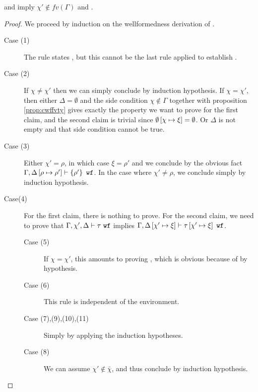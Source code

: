 \documentclass[a4paper]{article}
\begin{document}
\begin{prop}
   and \ctwf{\Gamma}{\xi} imply $\chi'\notin fv(\Gamma)$ and
  .
  \label{prop:cwftysub}
\end{prop}
\begin{proof}
  We proceed by induction on the wellformedness derivation of . 
  \begin{description}

    \item[Case (1)] The rule states \cwf{\emptyset}, but this cannot be the
      last rule applied to establish .

    \item[Case (2)] If $\chi \neq \chi'$ then we can simply conclude by induction
      hypothesis. If $\chi = \chi'$, then either $\Delta=\emptyset$ and the side
      condition $\chi\notin\Gamma$ together with proposition \ref{prop:cwffvty} gives
      exactly the property we want to prove for the first claim, and the
      second claim is trivial since $\emptyset\left[ \chi\mapsto \xi \right] =
      \emptyset$. Or $\Delta$ is not empty and that side condition cannot be true.

    \item[Case (3)] Either $\chi' = \rho$, in which case $\xi = \rho'$ and we conclude by
      the obvious fact ${\normalfont \Gamma,\Delta\left[ \rho\mapsto \rho' \right] \vdash \left\{ \rho' \right\}\ \texttt{wf}}$. In the case
      where $\chi' \neq \rho$, we conclude simply by induction hypothesis.

    \item[Case(4)] For the first claim, there is nothing to prove. For the
      second claim, we need to prove that ${\normalfont \Gamma,\chi',\Delta \vdash \tau\ \texttt{wf}}$ implies
      ${\normalfont \Gamma,\Delta\left[ \chi'\mapsto \xi \right] \vdash \tau\left[ \chi'\mapsto \xi \right]\ \texttt{wf}}$.

      \begin{description}

        \item[Case (5)] If $\chi = \chi'$, this amounts to proving
          \ctwf{\Gamma,\tsub{\Delta}{\chi\mapsto \chi}}{\xi}, which is obvious because of
          \ctwf{\Gamma}{\xi} by hypothesis.

        \item[Case (6)] This rule is independent of the environment.

        \item[Case (7),(9),(10),(11)] Simply by applying the induction
          hypotheses.

        \item[Case (8)] We can assume $\chi'\notin \bar{\chi}$, and thus conclude by
          induction hypothesis.

      \end{description}
  \end{description}
\end{proof}
\end{document}
